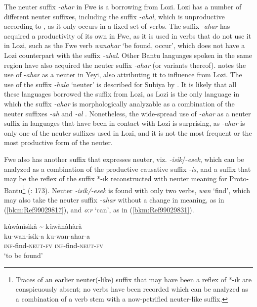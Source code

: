 The neuter suffix \textit{-ahar} in Fwe is a borrowing from Lozi. Lozi has a number of different neuter suffixes, including the suffix \textit{-ahal}, which is unproductive according to \citet[60-61]{Gowlett1967}, as it only occurs in a fixed set of verbs. The suffix \textit{-ahar} has acquired a productivity of its own in Fwe, as it is used in verbs that do not use it in Lozi, such as the Fwe verb \textit{wanahar} ‘be found, occur’, which does not have a Lozi counterpart with the suffix \textit{-ahal}. Other Bantu languages spoken in the same region have also acquired the neuter suffix \textit{-ahar} (or variants thereof). \citet[245]{Seidel2008} notes the use of \nobreakdash-\textit{ahar} as a neuter in Yeyi, also attributing it to influence from Lozi. The use of the suffix \textit{-hala} ‘neuter’ is described for Subiya by {\citet[77]{Jacottet1896}}. It is likely that all these languages borrowed the suffix from Lozi, as Lozi is the only language in which the suffix \textit{-ahar} is morphologically analyzable as a combination of the neuter suffixes \textit{-ah} and \textit{-al} \citep[60]{Gowlett1967}. Nonetheless, the wide-spread use of \textit{-ahar} as a neuter suffix in languages that have been in contact with Lozi is surprising, as \textit{-ahar} is only one of the neuter suffixes used in Lozi, and it is not the most frequent or the most productive form of the neuter.

Fwe also has another suffix that expresses neuter, viz. \textit{-isik}/-\textit{esek}, which can be analyzed as a combination of the productive causative suffix \textit{\nobreakdash-is}, and a suffix that may be the reflex of the suffix *-ɪk reconstructed with neuter meaning for Proto-Bantu\footnote{Traces of an earlier neuter(-like) suffix that may have been a reflex of *-ɪk are conspicuously absent; no verbs have been recorded which can be analyzed as a combination of a verb stem with a now-petrified neuter-like suffix.}  (\citealt{SchadebergBostoen2019}: 173). Neuter \textit{-isik/-esek} is found with only two verbs, \textit{wan} ‘find’, which may also take the neuter suffix \textit{-ahar} without a change in meaning, as in (\ref{bkm:Ref99029817}), and \textit{oːr} ‘can’, as in (\ref{bkm:Ref99029831}).

\ea
\label{bkm:Ref99029817}
\glll kùwànìsìkà    {\textasciitilde}   kùwànàhàrà\\
ku-wan-isik-a  {}  ku-wan-ahar-a\\
\textsc{inf}-find-\textsc{neut}-\textsc{fv}   {} \textsc{inf}-find-\textsc{neut}-\textsc{fv}\\
\glt ‘to be found’
\z

